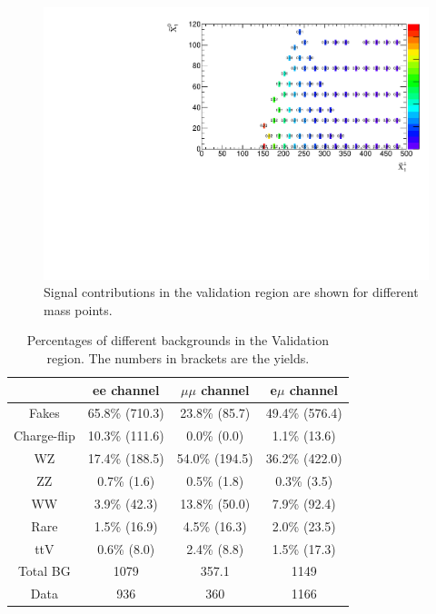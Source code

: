 \begin{figure}[htbp]
\begin{center}
\includegraphics[width=\textwidth]{data/plot/DataFakes/FakeEff/signal_contamination.pdf}
\caption{Signal contributions in the validation region are shown for different mass points.}
\label{fig:signal_contribution_fakes}
\end{center}
\end{figure}

\begin{table}[htbp]
\begin{center}
\begin{tabular}{|c|c|c|c|}
\hline
\hline
& ee channel & $\mu\mu$ channel & e$\mu$ channel\\
\hline
\hline
Fakes       & 65.8\% (710.3) & 23.8\% (85.7)  & 49.4\% (576.4)\\
Charge-flip & 10.3\% (111.6) &  0.0\% (0.0)   &  1.1\% (13.6)\\
WZ          & 17.4\% (188.5) & 54.0\% (194.5) & 36.2\% (422.0)\\
ZZ          &  0.7\% (1.6)   &  0.5\% (1.8)   &  0.3\% (3.5)\\
WW          &  3.9\% (42.3)  & 13.8\% (50.0)  &  7.9\% (92.4)\\
Rare        &  1.5\% (16.9)  &  4.5\% (16.3)  &  2.0\% (23.5)\\
ttV         &  0.6\% (8.0)   &  2.4\% (8.8)   &  1.5\% (17.3)\\
\hline
Total BG    & 1079           & 357.1          & 1149\\
\hline
Data        &  936           &  360           & 1166\\
\hline
\end{tabular}
\caption{Percentages of different backgrounds in the Validation region. The numbers in brackets are the yields.}
\label{tab:VRfakes_compos}
\end{center}
\end{table}

